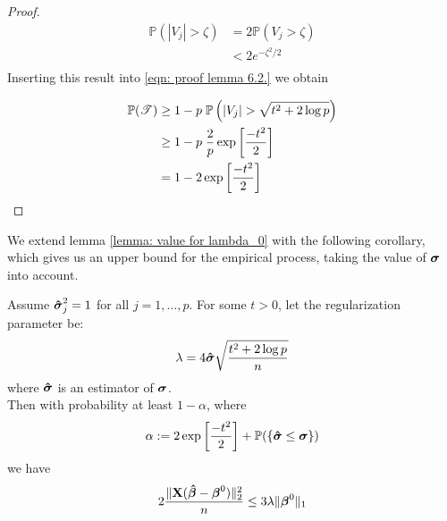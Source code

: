 \begin{proof}
    \begin{align*}
        \mathbb{P} (|V_j| > \zeta) & = 2 \mathbb{P} (V_j > \zeta) \\
                                   & < 2 e^{-\zeta^2/2}           \\
    \end{align*}
    Inserting this result into \eqref{eqn: proof lemma 6.2.} we obtain

    \begin{align*}
        \mathbb{P}(\mathscr{T}) & \geq 1 - p \; \P \left( | V_{j} | > \sqrt{t^{2}+2 \log p}  \right) \\
                                & \geq 1 - p \; \frac{2}{p} \exp \left[ \frac{- t^{2}}{2} \right]    \\
                                & = 1 - 2 \exp \left[ \frac{- t^{2}}{2} \right]                      \\
    \end{align*}
\end{proof}
We extend lemma \ref{lemma: value for lambda_0} with the following corollary, which gives us an upper bound for the empirical process, taking the value of \(\sgm\) into account.
\begin{corollary} %
    Assume $\sgmhat^2_j = 1$ for all \(j = 1, \ldots, p\). For some \(t > 0\), let the regularization parameter be:
    \[
        \lambda = 4 \sgmhat \sqrt{\frac{t^2 + 2 \log p}{n}}
    \]
    where $\sgmhat$ is an estimator of $\sgm$. \\
    Then with probability at least $1 - \alpha$, where
    \[
        \alpha := 2 \exp \left[ \frac{- t^{2}}{2} \right] + \P (\{\sgmhat \leq \sgm\})
    \]
    we have
    \[
        2 \frac{\| \X (\btahat - \bta^0)\|_2^2}{n} \leq 3 \lambda \| \bta^0 \|_1
    \]
\end{corollary}

